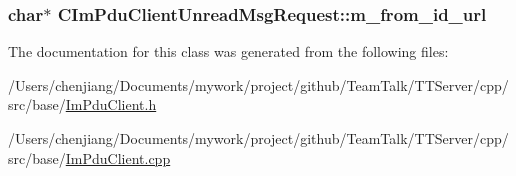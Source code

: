 \subsubsection[{m\+\_\+from\+\_\+id\+\_\+url}]{\setlength{\rightskip}{0pt plus 5cm}char$\ast$ C\+Im\+Pdu\+Client\+Unread\+Msg\+Request\+::m\+\_\+from\+\_\+id\+\_\+url\hspace{0.3cm}{\ttfamily [private]}}\label{class_c_im_pdu_client_unread_msg_request_a08c30599b6d89e8eb7d26d9f5d0b5497}


The documentation for this class was generated from the following files\+:\begin{DoxyCompactItemize}
\item 
/\+Users/chenjiang/\+Documents/mywork/project/github/\+Team\+Talk/\+T\+T\+Server/cpp/src/base/\hyperlink{_im_pdu_client_8h}{Im\+Pdu\+Client.\+h}\item 
/\+Users/chenjiang/\+Documents/mywork/project/github/\+Team\+Talk/\+T\+T\+Server/cpp/src/base/\hyperlink{_im_pdu_client_8cpp}{Im\+Pdu\+Client.\+cpp}\end{DoxyCompactItemize}
